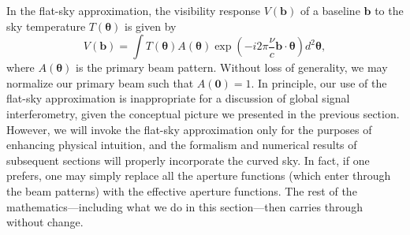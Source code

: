 \documentclass[twocolumn,apj,numberedappendix]{emulateapj}
\newcommand{\acl}[1]{}
\begin{document}
In the flat-sky approximation, the visibility response $V(\mathbf{b})$ of a baseline $\mathbf{b}$ to the sky temperature $T(\boldsymbol \theta)$ is given by
\begin{equation}
\label{eq:Vb}
V(\mathbf{b}) = \int  T(\boldsymbol \theta) A(\boldsymbol \theta) \exp \left( -i 2 \pi \frac{\nu}{c} \mathbf{b} \cdot \boldsymbol \theta \right) d^2 \mathbf{\theta},
\end{equation}
where $ A(\boldsymbol \theta)$ is the primary beam pattern. Without loss of generality, we may normalize our primary beam such that $A(\mathbf{0}) = 1$. In principle, our use
of the flat-sky approximation is inappropriate for a discussion of global signal interferometry,
given the conceptual picture we presented in the previous section. However, we will
invoke the flat-sky approximation only for the purposes of enhancing physical intuition, and
the formalism and numerical results of subsequent sections will properly incorporate the
curved sky. In fact, if one prefers, one may simply replace all the aperture functions
(which enter through the beam patterns) with the effective aperture functions. The
rest of the mathematics---including what we do in this section---then carries through without change.\acl{Added to the end of this paragraph}
\end{document}
